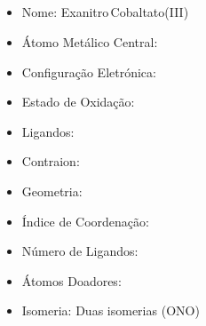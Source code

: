 \documentclass[12pt]{article}
\begin{document}
\noindent\begin{minipage}{\textwidth}
	
	\subsection{}
	\begin{itemize}
   \item Nome: Exanitro\,Cobaltato(III) 
   	
   
   \item Átomo Metálico Central:
   	
   	
   \item Configuração Eletrónica:
   
   
   \item Estado de Oxidação:
   
   
   \item Ligandos:
   
   
   \item Contraion:
   
   
   \item Geometria:
   
   
   \item Índice de Coordenação: 
   
   
   \item Número de Ligandos:
   
   
   \item Átomos Doadores:
   
   
   \item Isomeria:
   	Duas isomerias
		(ONO)
	\end{itemize}
	
\end{minipage}
\end{document}
